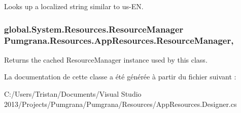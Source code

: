 Looks up a localized string similar to us-\/\+E\+N. 

\hypertarget{class_pumgrana_1_1_resources_1_1_app_resources_a91d03405933ec60ad0240a65af69f13d}{
\subsubsection[{Resource\+Manager}]{\setlength{\rightskip}{0pt plus 5cm}global.\+System.\+Resources.\+Resource\+Manager Pumgrana.\+Resources.\+App\+Resources.\+Resource\+Manager\hspace{0.3cm}{\ttfamily [static]}, {\ttfamily [get]}}}\label{class_pumgrana_1_1_resources_1_1_app_resources_a91d03405933ec60ad0240a65af69f13d}


Returns the cached Resource\+Manager instance used by this class. 



La documentation de cette classe a été générée à partir du fichier suivant \+:\begin{DoxyCompactItemize}
\item 
C\+:/\+Users/\+Tristan/\+Documents/\+Visual Studio 2013/\+Projects/\+Pumgrana/\+Pumgrana/\+Resources/App\+Resources.\+Designer.\+cs\end{DoxyCompactItemize}
